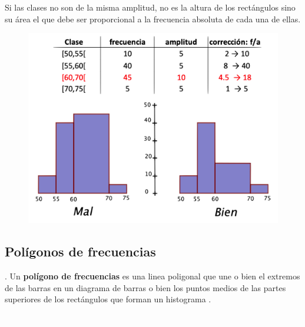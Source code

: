 \vspace{5mm}%
\begin{example}

	Si las clases no son de la misma amplitud, no es la altura de los rectángulos sino su área el que debe ser proporcional a la frecuencia absoluta de cada una de ellas.

\begin{figure}[H]
			\centering
			\includegraphics[width=.7\textwidth]{imagenes/imagenes01/T01IM04.png}
		\end{figure}

\end{example}



\subsection{Polígonos de frecuencias}

\begin{definition}
	. Un \textbf{polígono de frecuencias} es una linea poligonal que une o bien el extremos de las barras en un diagrama de barras o bien los puntos medios de las partes superiores de los rectángulos que forman un histograma	.
\end{definition}


\vspace{3cm} %

\textcolor{white}{.}  %

\vspace{3cm} %

